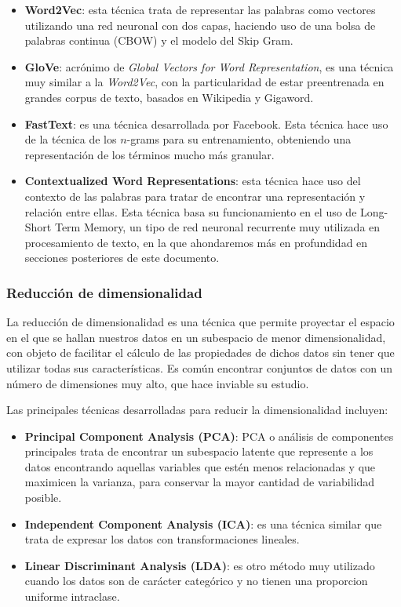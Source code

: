 \begin{itemize}
    \item \textbf{Word2Vec}: esta técnica trata de representar las palabras como vectores utilizando una red neuronal con dos capas, haciendo uso de una bolsa de palabras continua (CBOW) y el modelo del Skip Gram. \cite{Mikolov2013Word2Vec}
    \item \textbf{GloVe}: acrónimo de \textit{Global Vectors for Word Representation}, es una técnica muy similar a la \textit{Word2Vec}, con la particularidad de estar preentrenada en grandes corpus de texto, basados en Wikipedia y Gigaword. \cite{Pennington2014GloveGV}
    \item \textbf{FastText}: es una técnica desarrollada por Facebook. Esta técnica hace uso de la técnica de los $n$-grams para su entrenamiento, obteniendo una representación de los términos mucho más granular. \cite{Bojanowski2017EnrichingWV}
    \item \textbf{Contextualized Word Representations}: esta técnica hace uso del contexto de las palabras para tratar de encontrar una representación y relación entre ellas. Esta técnica basa su funcionamiento en el uso de Long-Short Term Memory, un tipo de red neuronal recurrente muy utilizada en procesamiento de texto, en la que ahondaremos más en profundidad en secciones posteriores de este documento. \cite{Melamud2016context2vecLG}
\end{itemize}

\subsubsection{Reducción de dimensionalidad}
La reducción de dimensionalidad es una técnica que permite proyectar el espacio en el que se hallan nuestros datos en un subespacio de menor dimensionalidad, con objeto de facilitar el cálculo de las propiedades de dichos datos sin tener que utilizar todas sus características. Es común encontrar conjuntos de datos con un número de dimensiones muy alto, que hace inviable su estudio.

Las principales técnicas desarrolladas para reducir la dimensionalidad incluyen:

\begin{itemize}
    \item \textbf{Principal Component Analysis (PCA)}: PCA o análisis de componentes principales trata de encontrar un subespacio latente que represente a los datos encontrando aquellas variables que estén menos relacionadas y que maximicen la varianza, para conservar la mayor cantidad de variabilidad posible. \cite{Jolliffe:1986} 
    \item \textbf{Independent Component Analysis (ICA)}: es una técnica similar que trata de expresar los datos con transformaciones lineales. \cite{Hyvrinen2014TopographicIC}
    \item \textbf{Linear Discriminant Analysis (LDA)}: es otro método muy utilizado cuando los datos son de carácter categórico y no tienen una proporcion uniforme intraclase. \cite{LDA2009}
\end{itemize}

